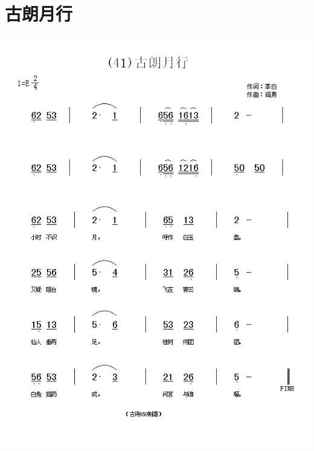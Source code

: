 \documentclass[cn,pad,twocol]{elegantbook}
\begin{document}
\section{古朗月行}  \includegraphics[width=\textwidth]{dongxiao/20200808-古朗月行-李白.jpg}    
\end{document}
